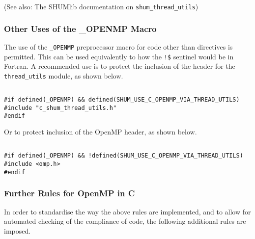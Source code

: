 (See also: The SHUMlib documentation on \verb|shum_thread_utils|)

\subsubsection*{Other Uses of the \_OPENMP Macro}
The use of the \verb|_OPENMP| preprocessor macro for code other than directives is permitted.
This can be used equivalently to how the \verb|!$| sentinel would be in Fortran.
A recommended use is to protect the inclusion of the header for the  \verb|thread_utils| module, as shown below.

\begin{minipage}{\linewidth}
\begin{verbatim}

#if defined(_OPENMP) && defined(SHUM_USE_C_OPENMP_VIA_THREAD_UTILS)
#include "c_shum_thread_utils.h"
#endif

\end{verbatim}
\end{minipage}

Or to protect inclusion of the OpenMP header, as shown below.

\begin{minipage}{\linewidth}
\begin{verbatim}

#if defined(_OPENMP) && !defined(SHUM_USE_C_OPENMP_VIA_THREAD_UTILS)
#include <omp.h>
#endif

\end{verbatim}
\end{minipage}

\subsubsection*{Further Rules for OpenMP in C}

In order to standardise the way the above rules are implemented, and to allow for automated checking
of the compliance of code, the following additional rules are imposed.

